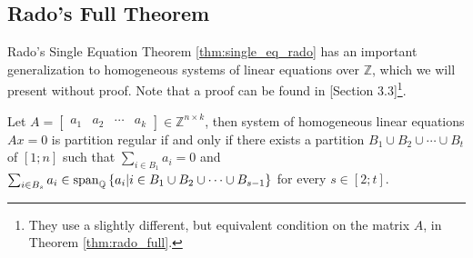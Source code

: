 \subsection{Rado's Full Theorem}
Rado's Single Equation Theorem \ref{thm:single_eq_rado} has an important generalization to homogeneous systems of linear equations over $\mathbb{Z}$, which we will present without proof. Note that a proof can be found in \cite{rt}[Section 3.3]\footnote{They use a slightly different, but equivalent condition on the matrix $A$, in Theorem \ref{thm:rado_full}.}.

\begin{theorem}\label{thm:rado_full}
	Let $A = \begin{bmatrix} a_1 & a_2 & \cdots & a_{k} \end{bmatrix} \in \mathbb{Z}^{n \times k}$, then system of homogeneous linear equations $Ax = 0$ is partition regular if and only if there exists a partition $B_1 \cup B_2 \cup \cdots \cup B_{t}$ of $[1; n]$  such that $\sum_{i \in B_1} a_{i} = 0$ and $\sum_{i \in B_s} a_i \in \textnormal{span}_{\mathbb{Q}} \left\{a_i \middle| i \in B_1 \cup B_2 \cup \cdots \cup B_{s - 1}\right\}$ for every $s \in [2; t]$.
\end{theorem}


